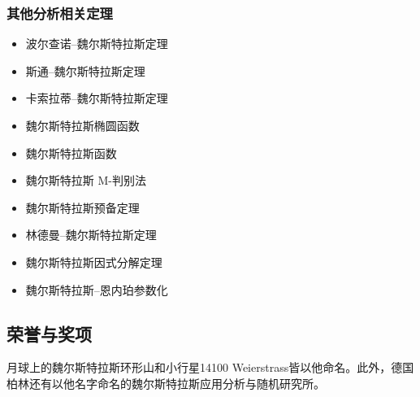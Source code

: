 \subsubsection{其他分析相关定理}
\begin{itemize}
\item 波尔查诺–魏尔斯特拉斯定理
\item 斯通–魏尔斯特拉斯定理
\item 卡索拉蒂–魏尔斯特拉斯定理
\item 魏尔斯特拉斯椭圆函数
\item 魏尔斯特拉斯函数
\item 魏尔斯特拉斯 M-判别法
\item 魏尔斯特拉斯预备定理
\item 林德曼–魏尔斯特拉斯定理
\item 魏尔斯特拉斯因式分解定理
\item 魏尔斯特拉斯–恩内珀参数化
\end{itemize}
\subsection{荣誉与奖项}
月球上的魏尔斯特拉斯环形山和小行星14100 Weierstrass皆以他命名。此外，德国柏林还有以他名字命名的魏尔斯特拉斯应用分析与随机研究所。

